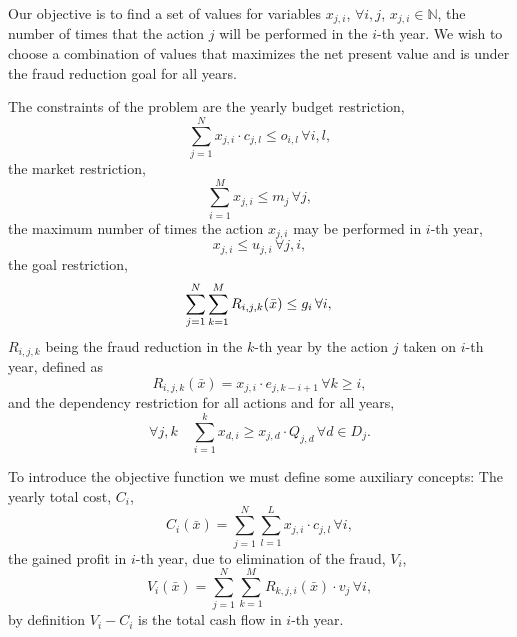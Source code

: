 Our objective is to find a set of values for variables $x_{j,i}$, $\forall i,j$, $x_{j,i} \in \mathbb{N} $, 
the number of times that the action $j$ will be performed in the $i$-th year. We wish to choose a combination
of values that maximizes the net present value and is under the fraud reduction goal for all years. 

The constraints of the problem are the yearly budget restriction,
\begin{equation}
    \sum_{j=1}^{N} x_{j, i} \cdot c_{j,l} \le o_{i,l} \, \forall i, l,
	\label{eq:budget}
\end{equation}
the market restriction,
\begin{equation}
     \sum_{i=1}^{M} x_{j, i} \le m_j \, \forall j,
	\label{eq:market}
\end{equation}
the maximum number of times the action $x_{j, i}$ may be performed in $i$-th year,
\begin{equation}
     x_{j, i} \le u_{j, i} \, \forall j, i,
	\label{eq:maxacts}
\end{equation}
the goal restriction,
\begin{equation}
    \label{eq:goal}
    \sum_{j=1}^{N} \sum_{k=1}^{M}R_{i,j,k}(\bar{x}) \leq g_i \, \forall i, \\
\end{equation}
$R_{i,j,k}$ being the fraud reduction in the $k$-th year by the action $j$ taken on $i$-th year, defined as
\begin{equation}
    \label{eq:rec}
    R_{i,j,k}(\bar{x}) = x_{j, i} \cdot e_{j, k - i + 1} \, \forall k \geq i,
\end{equation}
and the dependency restriction for all actions and for all years,
\begin{equation}
    \label{eq:dependency}
    \forall j,k \quad \sum_{i=1}^{k} x_{d, i} \ge x_{j, d} \cdot Q_{j, d} \, \forall d \in D_j.
\end{equation}

To introduce the objective function we must define some auxiliary concepts:
The yearly total cost, $C_i$,
\begin{equation}
\label{eq:cost}
C_{i}(\bar{x}) =  \sum_{j=1}^{N} \sum_{l=1}^{L} x_{j, i} \cdot c_{j,l} \, \forall i,
\end{equation}
the gained profit in $i$-th year, due to elimination of the fraud, $V_i$,
\begin{equation}
    V_{i}(\bar{x}) = \sum_{j=1}^{N} \sum_{k=1}^{M} R_{k, j, i}(\bar{x}) \cdot v_j \, \forall i,
\end{equation}
by definition $V_i - C_i$ is the total cash flow in $i$-th year. 

